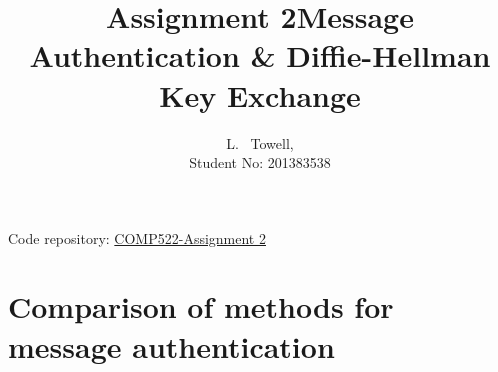 \documentclass[a4paper, twoside, 11pt]{article}
\author{L. ~Towell,\\ Student No: 201383538}
\title{Assignment 2\break Message Authentication \& Diffie-Hellman Key Exchange}
\begin{document}
	\maketitle

\maketitle
\begin{center}
Code repository: \href{https://github.com/luketowell/COMP522-Assignment2}{COMP522-Assignment 2}
\end{center}

\section{Comparison of methods for message authentication}
\end{document}

